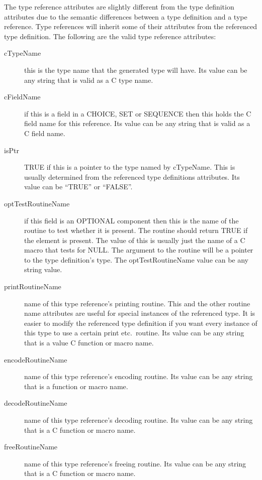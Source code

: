 The type reference attributes are slightly different from the type
definition attributes due to the semantic differences between a type
definition and a type reference.  Type references will inherit some of
their attributes from the referenced type definition.  The following
are the valid type reference attributes:
\begin{description}
\item[cTypeName] { this is the type name that the generated type will
have. Its value can be any string that is valid as a C type name.}

\item[cFieldName] { if this is a field in a CHOICE, SET or SEQUENCE
then this holds the C field name for this reference. Its value can be
any string that is valid as a C field name.}

\item[isPtr] { TRUE if this is a pointer to the type named by
cTypeName.  This is usually determined from the referenced type
definitions attributes. Its value can be ``TRUE'' or ``FALSE''.}

\item[optTestRoutineName] {if this field is an OPTIONAL component then
this is the name of the routine to test whether it is present.  The
routine should return TRUE if the element is present.  The value of
this is usually just the name of a C macro that tests for NULL\@. The
argument to the routine will be a pointer to the type definition's
type.  The optTestRoutineName value can be any string value.}

\item[printRoutineName] { name of this type reference's printing
routine.  This and the other routine name attributes are useful for
special instances of the referenced type.  It is easier to modify the
referenced type definition if you want every instance of this type to
use a certain print etc.\  routine.  Its value can be any string that is
a value C function or macro name.}

\item[encodeRoutineName]{ name of this type reference's encoding
routine. Its value can be any string that is a function or
macro name.}

\item[decodeRoutineName]{ name of this type reference's decoding
routine. Its value can be any string that is a C function or
macro name.}

\item[freeRoutineName]  { name of this type reference's freeing
routine. Its value can be any string that is a C function or
macro name.}


\end{description}
